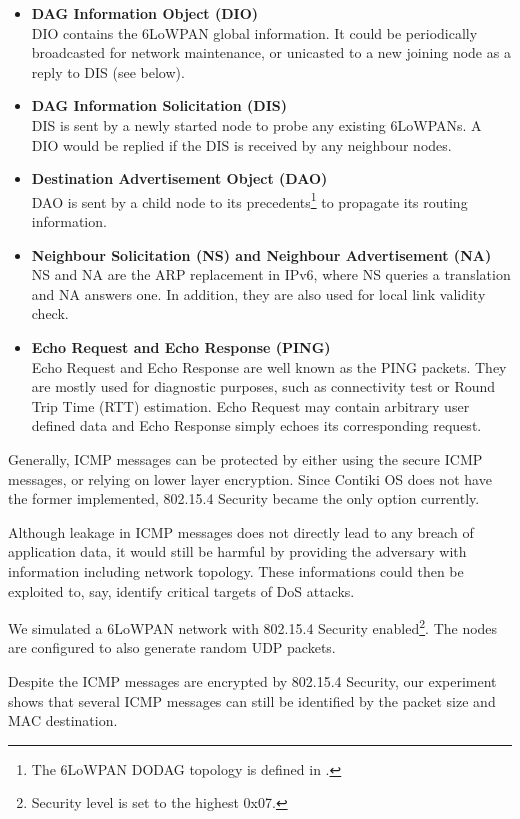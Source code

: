 \begin{itemize}
	\item \textbf{DAG Information Object (DIO)} \\
	DIO contains the 6LoWPAN global information. It could be periodically broadcasted for network maintenance, or unicasted to a new joining node as a reply to DIS (see below).
	\item \textbf{DAG Information Solicitation (DIS)} \\
	DIS is sent by a newly started node to probe any existing 6LoWPANs. A DIO would be replied if the DIS is received by any neighbour nodes.
	\item \textbf{Destination Advertisement Object (DAO)} \\
	DAO is sent by a child node to its precedents\footnote{The 6LoWPAN DODAG topology is defined in \cite{rfc6550}.} to propagate its routing information.
	\item \textbf{Neighbour Solicitation (NS) and Neighbour Advertisement (NA)} \\
	NS and NA are the ARP replacement in IPv6, where NS queries a translation and NA answers one. In addition, they are also used for local link validity check.
	\item \textbf{Echo Request and Echo Response (PING)} \\
	Echo Request and Echo Response are well known as the PING packets. They are mostly used for diagnostic purposes, such as connectivity test or Round Trip Time (RTT) estimation. Echo Request may contain arbitrary user defined data and Echo Response simply echoes its corresponding request.
\end{itemize}

Generally, ICMP messages can be protected by either using the secure ICMP messages, or relying on lower layer encryption. Since Contiki OS does not have the former implemented, 802.15.4 Security became the only option currently.

Although leakage in ICMP messages does not directly lead to any breach of application data, it would still be harmful by providing the adversary with information including network topology. These informations could then be exploited to, say, identify critical targets of DoS attacks. 

We simulated a 6LoWPAN network with 802.15.4 Security enabled\footnote{Security level is set to the highest 0x07.}. The nodes are configured to also generate random UDP packets. 

Despite the ICMP messages are encrypted by 802.15.4 Security, our experiment shows that several ICMP messages can still be identified by the packet size and MAC destination. 

